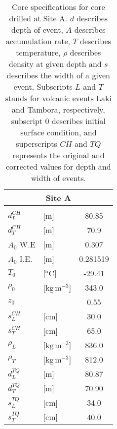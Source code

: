 \documentclass[../../CompleteThesis2/Complete_2ndDraft]{subfiles}
\begin{document}
\begin{table}[h]
	\centering
	\begin{tabular}{l l|c}
		\multicolumn{3}{c}{\textbf{Site A}} \\[0.1cm] 
		\hline 
		&& \\
		$d_{L}^{CH}$ & [m] & 80.85 \\[0.15cm]
		$d_{T}^{CH}$ & [m] & 70.9 \\[0.15cm]
		$A_0$ W.E & [m] & 0.307 \\[0.15cm]
		$A_0$ I.E. & [m] & 0.281519 \\[0.15cm]
		$T_0$ & [$^{\text{o}}$C] & -29.41 \\[0.15cm]
		$\rho_0$ & [$\text{kg}\,\text{m}^{-3}$] & 343.0\\[0.15cm]
		$z_0$ & & 0.55 \\[0.15cm]
		$s_L^{CH}$ & [cm] & 30.0 \\[0.15cm]
		$s_T^{CH}$ & [cm] & 65.0 \\[0.15cm]
		$\rho_L$ & [$\text{kg}\,\text{m}^{-3}$] & 836.0 \\[0.15cm]
		$\rho_T$ & [$\text{kg}\,\text{m}^{-3}$] & 812.0 \\[0.15cm]		
		$d_{L}^{TQ}$ & [m] & 80.87 \\[0.15cm]
		$d_{T}^{TQ}$ & [m] & 70.90 \\[0.15cm]
		$s_L^{TQ}$ & [cm] & 34.0 \\[0.15cm]
		$s_T^{TQ}$ & [cm] & 40.0 \\[0.15cm]
		
	\end{tabular}
	\caption{\footnotesize Core specifications for core drilled at Site A. $d$ describes depth of event, $A$ describes accumulation rate, $T$ describes temperature, $\rho$ describes density at given depth and $s$ describes the width of a given event. Subscripts $L$ and $T$ stands for volcanic events Laki and Tambora, respectively, subscript $0$ describes initial surface condition, and superscripts $CH$ and $TQ$ represents the original and corrected values for depth and width of events.}
	\label{Tab:SiteA_CoreSpecs}
\end{table}
\end{document}
